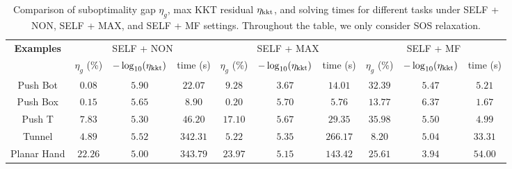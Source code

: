 \begin{table*}[t]
    \centering
    \begin{adjustbox}{width=0.95\linewidth}
    \begin{tabular}{|c|ccc|ccc|ccc|}
    \hline
    \multirow{1}{*}{\textbf{Examples}} 
               & \multicolumn{3}{c|}{SELF + NON}                             
               & \multicolumn{3}{c|}{SELF + MAX}                             
               & \multicolumn{3}{c|}{SELF + MF}                              \\ \cline{2-10} 
               & $\eta_g$ (\%)      & $-\log_{10}(\eta_{\text{kkt}})$      & time (s)        
               & $\eta_g$ (\%)    & $-\log_{10}(\eta_{\text{kkt}})$     & time (s)        
               & $\eta_g$ (\%)    & $-\log_{10}(\eta_{\text{kkt}})$     & time (s)        \\ \hline
    Push Bot    & $0.08$   & $5.90$        & $22.07$           
               & $9.28$   & $3.67$        & $14.01$           
               & $32.39$  & $5.47$        & $5.21$            \\ \hline
    Push Box    & $0.15$   & $5.65$        & $8.90$                
               & $0.20$   & $5.70$        & $5.76$                 
               & $13.77$  & $6.37$        & $1.67$                 \\ \hline
    Push T      & $7.83$   & $5.30$        & $46.20$           
               & $17.10$  & $5.67$        & $29.35$           
               & $35.98$  & $5.50$        & $4.99$            \\ \hline
    Tunnel    & $4.89$   & $5.52$        & $342.31$          
               & $5.22$   & $5.35$        & $266.17$          
               & $8.20$   & $5.04$        & $33.31$           \\ \hline
    Planar Hand & $22.26$  & $5.00$        & $343.79$                 
               & $23.97$  & $5.15$        & $143.42$                
               & $25.61$  & $3.94$        & $54.00$                 \\ \hline
    \end{tabular}
    \end{adjustbox}
    \caption{Comparison of suboptimality gap $\eta_g$, max KKT residual $\eta_{\text{kkt}}$, and \MOSEK solving times for different tasks under SELF + NON, SELF + MAX, and SELF + MF settings. Throughout the table, we only consider SOS relaxation. \label{tab:results}}
    
\end{table*}